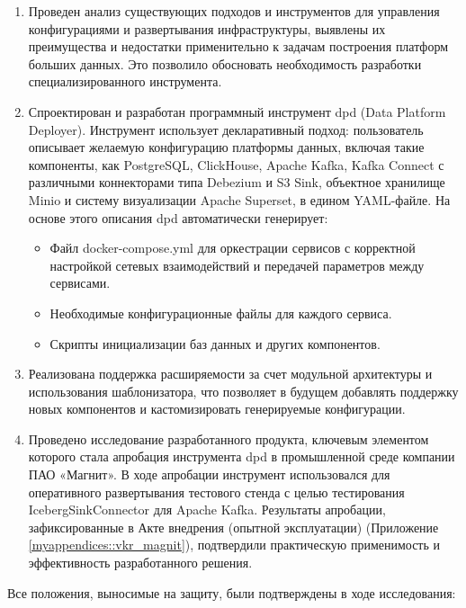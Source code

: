 \begin{enumerate}[1.]
    \item Проведен анализ существующих подходов и инструментов для управления конфигурациями и развертывания инфраструктуры, выявлены их преимущества и недостатки применительно к задачам построения платформ больших данных. Это позволило обосновать необходимость разработки специализированного инструмента.
    \item Спроектирован и разработан программный инструмент dpd (Data Platform Deployer). Инструмент использует декларативный подход: пользователь описывает желаемую конфигурацию платформы данных, включая такие компоненты, как PostgreSQL, ClickHouse, Apache Kafka, Kafka Connect с различными коннекторами типа Debezium и S3 Sink, объектное хранилище Minio и систему визуализации Apache Superset, в едином YAML-файле. На основе этого описания dpd автоматически генерирует:
          \begin{itemize}
              \item Файл docker-compose.yml для оркестрации сервисов с корректной настройкой сетевых взаимодействий и передачей параметров между сервисами.
              \item Необходимые конфигурационные файлы для каждого сервиса.
              \item Скрипты инициализации баз данных и других компонентов.
          \end{itemize}
    \item Реализована поддержка расширяемости за счет модульной архитектуры и использования шаблонизатора, что позволяет в будущем добавлять поддержку новых компонентов и кастомизировать генерируемые конфигурации.
    \item Проведено исследование разработанного продукта, ключевым элементом которого стала апробация инструмента dpd в промышленной среде компании ПАО «Магнит». В ходе апробации инструмент использовался для оперативного развертывания тестового стенда с целью тестирования IcebergSinkConnector для Apache Kafka. Результаты апробации, зафиксированные в Акте внедрения (опытной эксплуатации) (Приложение \ref{myappendices::vkr_magnit}), подтвердили практическую применимость и эффективность разработанного решения.
\end{enumerate}
Все положения, выносимые на защиту, были подтверждены в ходе исследования:

